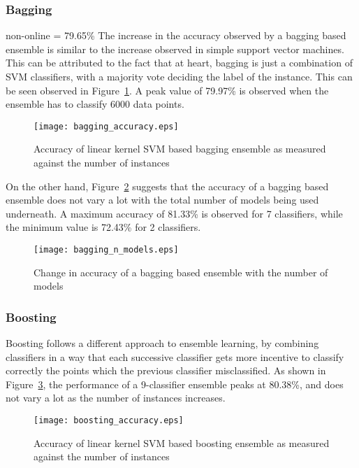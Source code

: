 \subsubsection{Bagging}
non-online = 79.65\%
The increase in the accuracy observed by a bagging based ensemble is similar to the increase observed in simple support vector machines. This can be attributed to the fact that at heart, bagging is just a combination of SVM classifiers, with a majority vote deciding the label of the instance. This can be seen observed in Figure~\ref{bagging_accuracy}. A peak value of 79.97\% is observed when the ensemble has to classify 6000 data points.
\begin{figure}
    \centering
    \texttt{[image: bagging\_accuracy.eps]}
    \caption{Accuracy of linear kernel SVM based bagging ensemble as measured against the number of instances}
    \label{bagging_accuracy}
\end{figure}

On the other hand, Figure~\ref{bagging_n_models} suggests that the accuracy of a bagging based ensemble does not vary a lot with the total number of models being used underneath. A maximum accuracy of 81.33\% is observed for 7 classifiers, while the minimum value is 72.43\% for 2 classifiers.
\begin{figure}
    \centering
    \texttt{[image: bagging\_n\_models.eps]}
    \caption{Change in accuracy of a bagging based ensemble with the number of models}
    \label{bagging_n_models}
\end{figure}

\subsubsection{Boosting}
Boosting follows a different approach to ensemble learning, by combining classifiers in a way that each successive classifier gets more incentive to classify correctly the points which the previous classifier misclassified. As shown in Figure~\ref{boosting_accuracy}, the performance of a 9-classifier ensemble peaks at 80.38\%, and does not vary a lot as the number of instances increases.
\begin{figure}
    \centering
    \texttt{[image: boosting\_accuracy.eps]}
    \caption{Accuracy of linear kernel SVM based boosting ensemble as measured against the number of instances}
    \label{boosting_accuracy}
\end{figure}

